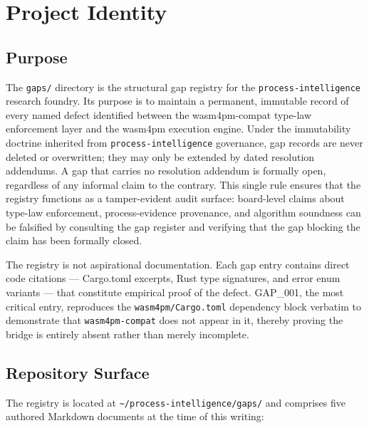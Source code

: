 
\section{Project Identity}
\label{sec:gaps-identity}

\subsection{Purpose}
\label{sec:gaps-identity-purpose}

The \texttt{gaps/} directory is the structural gap registry for the
\texttt{process-intelligence} research foundry. Its purpose is to maintain a permanent,
immutable record of every named defect identified between the wasm4pm-compat type-law
enforcement layer and the wasm4pm execution engine. Under the immutability doctrine
inherited from \texttt{process-intelligence} governance, gap records are never deleted
or overwritten; they may only be extended by dated resolution addendums. A gap that
carries no resolution addendum is formally open, regardless of any informal claim to the
contrary. This single rule ensures that the registry functions as a tamper-evident audit
surface: board-level claims about type-law enforcement, process-evidence provenance, and
algorithm soundness can be falsified by consulting the gap register and verifying that the
gap blocking the claim has been formally closed.

The registry is not aspirational documentation. Each gap entry contains direct code
citations — Cargo.toml excerpts, Rust type signatures, and error enum variants —
that constitute empirical proof of the defect. GAP\_001, the most critical entry,
reproduces the \texttt{wasm4pm/Cargo.toml} dependency block verbatim to demonstrate that
\texttt{wasm4pm-compat} does not appear in it, thereby proving the bridge is entirely
absent rather than merely incomplete.

\subsection{Repository Surface}
\label{sec:gaps-identity-surface}

The registry is located at \texttt{\textasciitilde/process-intelligence/gaps/} and
comprises five authored Markdown documents at the time of this writing:

